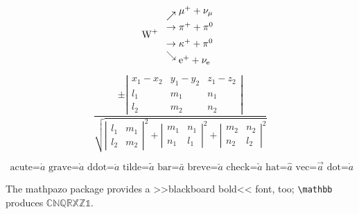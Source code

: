 \documentclass[11pt]{article}
\begin{document}
\begin{displaymath}
\mbox{W}^+\
\begin{array}{l}
\nearrow\raise5pt\hbox{$\mu^+ + \nu_{\mu}$}\\
\rightarrow         \pi^+ +\pi^0         \\[5pt]
\rightarrow \kappa^+ +\pi^0              \\
\searrow\lower5pt\hbox{$\mathrm{e}^+ 
          +\nu_{\scriptstyle\mathrm{e}}$}
\end{array}
\end{displaymath}

\begin{displaymath}
\frac{\pm
\left|\begin{array}{ccc}
x_1-x_2  & y_1-y_2 & z_1-z_2 \\
l_1      & m_1     & n_1     \\
l_2      & m_2     & n_2
\end{array}\right|}{
\sqrt{\left|\begin{array}{cc}l_1&m_1\\
l_2&m_2\end{array}\right|^2
+     \left|\begin{array}{cc}m_1&n_1\\
n_1&l_1\end{array}\right|^2
+     \left|\begin{array}{cc}m_2&n_2\\
n_2&l_2\end{array}\right|^2}}
\end{displaymath}

\begin{displaymath}
\mbox{ acute=}\acute{a}
\mbox{ grave=}\grave{a}
\mbox{ ddot=}\ddot {a}
\mbox{ tilde=}\tilde{a}
\mbox{ bar=}\bar  {a}
\mbox{ breve=}\breve{a}
\mbox{ check=}\check{a}
\mbox{ hat=}\hat  {a}
\mbox{ vec=}\vec  {a}
\mbox{ dot=}\dot  {a}
\end{displaymath}

\noindent The \textsf{mathpazo} package provides a %
>>blackboard bold<< font, too;  \verb|\mathbb| produces \( \mathbb{CNQRXZ1} \).
\end{document}
